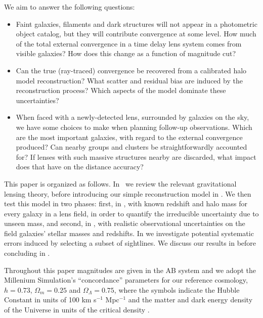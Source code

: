 \documentclass[useAMS,usenatbib]{mn2e}
\begin{document}
We aim to answer the following questions:
\begin{itemize}
\item Faint galaxies, filaments and dark structures will not appear in a photometric
object catalog, but they will contribute convergence at some level. How much of
the total external convergence in a time delay lens system comes from visible
galaxies? How does this change as a function of magnitude cut? 
\item Can the true (ray-traced) convergence be recovered from a calibrated halo model
reconstruction? What scatter and residual bias are induced by the reconstruction
process? Which aspects of the model dominate these uncertainties? 
\item When faced with a newly-detected lens, surrounded by galaxies on the sky,
we have some choices to make when planning follow-up observations.
Which are the most important galaxies, with regard to the external convergence
produced? Can nearby groups and clusters be straightforwardly accounted for? If
lenses with such massive structures nearby are discarded, what impact does that
have on the distance accuracy?
\end{itemize}


This paper is organized as follows. In~ we review the relevant
gravitational lensing theory, before introducing our simple reconstruction 
model in .  We then test this model in two phases: first, in
, with known redshift and halo mass for every galaxy in a
lens field, in order to quantify the irreducible uncertainty due to unseen mass,
and second, in , with realistic observational uncertainties
on the field galaxies' stellar masses and redshifts. In  we
investigate potential systematic errors induced by selecting a subset of sightlines.
We discuss our results in  before
concluding in .

Throughout this paper magnitudes are given in the AB system and
we adopt the Millenium Simulation's ``concordance'' parameters for our reference cosmology, \ie
$h=0.73$, $\Omega_m=0.25$ and $\Omega_\Lambda=0.75$, where the symbols indicate
the Hubble Constant in units of 100 km s$^{-1}$ Mpc$^{-1}$ and the matter and
dark energy density of the Universe in units of the critical density
.%
\end{document}
